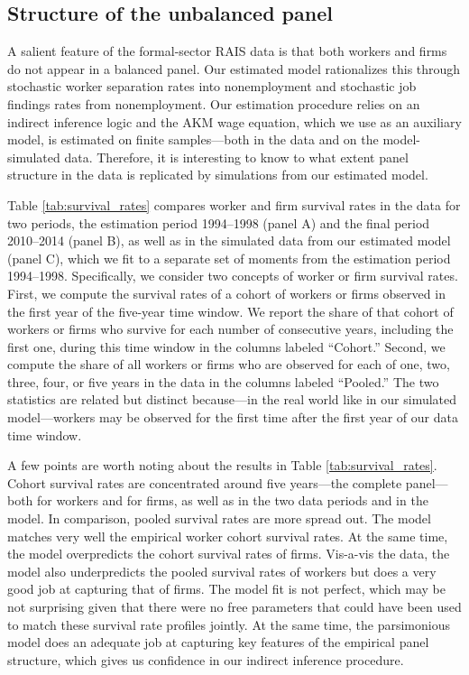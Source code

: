 \clearpage
\subsection{Structure of the unbalanced panel\label{app_subsec:survival_rates}}

A salient feature of the formal-sector RAIS data is that both workers and firms do not appear in a balanced panel. Our estimated model rationalizes this through stochastic worker separation rates into nonemployment and stochastic job findings rates from nonemployment. Our estimation procedure relies on an indirect inference logic and the AKM wage equation, which we use as an auxiliary model, is estimated on finite samples---both in the data and on the model-simulated data. Therefore, it is interesting to know to what extent panel structure in the data is replicated by simulations from our estimated model.

Table \ref{tab:survival_rates} compares worker and firm survival rates in the data for two periods, the estimation period 1994--1998 (panel A) and the final period 2010--2014 (panel B), as well as in the simulated data from our estimated model (panel C), which we fit to a separate set of moments from the estimation period 1994--1998. Specifically, we consider two concepts of worker or firm survival rates. First, we compute the survival rates of a cohort of workers or firms observed in the first year of the five-year time window. We report the share of that cohort of workers or firms who survive for each number of consecutive years, including the first one, during this time window in the columns labeled ``Cohort.'' Second, we compute the share of all workers or firms who are observed for each of one, two, three, four, or five years in the data in the columns labeled ``Pooled.'' The two statistics are related but distinct because---in the real world like in our simulated model---workers may be observed for the first time after the first year of our data time window.

A few points are worth noting about the results in Table \ref{tab:survival_rates}. Cohort survival rates are concentrated around five years---the complete panel---both for workers and for firms, as well as in the two data periods and in the model. In comparison, pooled survival rates are more spread out. The model matches very well the empirical worker cohort survival rates. At the same time, the model overpredicts the cohort survival rates of firms. Vis-a-vis the data, the model also underpredicts the pooled survival rates of workers but does a very good job at capturing that of firms. The model fit is not perfect, which may be not surprising given that there were no free parameters that could have been used to match these survival rate profiles jointly. At the same time, the parsimonious model does an adequate job at capturing key features of the empirical panel structure, which gives us confidence in our indirect inference procedure.


